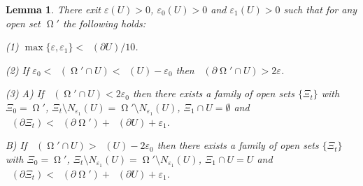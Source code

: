 \documentclass[12pt]{amsart}
\newtheorem{lemma}[theorem]{Lemma}
\DeclareMathOperator{\Hn}{\mathcal{H}^n}
\DeclareMathOperator{\Hnn}{\mathcal{H}^{n+1}}
\DeclareMathOperator{\Om}{\Omega}
\theoremstyle{definition}
\begin{document}
\begin{lemma} \label{epsilon}
There exit $\varepsilon(U)> 0$,
$\varepsilon_0(U)>0$ and $\varepsilon_1(U)>0$ such that 
for any open set $\Om'$
the following
holds:


    (1) $\max\{ \varepsilon, \varepsilon_1\} < 
    \Hn(\partial U)/10$.

    (2) If $\varepsilon_0 <\Hnn(\Om' \cap U)< 
    \Hnn(U) - \varepsilon_0$ then 
    $\Hn(\partial \Om' \cap U) > 2 \varepsilon$.
    
    (3) A) If $\Hnn(\Om' \cap U) < 2 \varepsilon_0$
    then there exists a family of open sets $\{ \Xi_t \}$
    with $\Xi_0 = \Om'$,
    $\Xi_t \setminus N_{\varepsilon_1} (U) = \Om' \setminus N_{\varepsilon_1} (U)$, $\Xi_1 \cap U = \emptyset$ and
    $\Hn(\partial \Xi_t)<  \Hn(\partial \Om')+ \Hn(\partial U) + \varepsilon_1$.
    
    B) If $\Hnn(\Om' \cap U) > \Hnn(U) - 2 \varepsilon_0$
    then there exists a family of open sets $\{ \Xi_t \}$
    with $\Xi_0 = \Om'$,
    $\Xi_t \setminus N_{\varepsilon_1} (U) = \Om' \setminus N_{\varepsilon_1} (U)$, $\Xi_1 \cap U=U$ and
    $\Hn(\partial \Xi_t)<  \Hn(\partial \Om')+ \Hn(\partial U)+ \varepsilon_1$.
    


\end{lemma}
\end{document}
